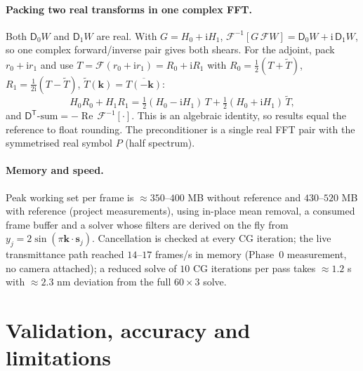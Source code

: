 \documentclass[11pt,a4paper]{article}
\theoremstyle{definition}
\newcommand{\vk}{\bm{k}}
\newcommand{\vs}{\bm{s}}
\newcommand{\ii}{\mathrm{i}}
\newcommand{\FT}{\mathcal{F}}
\newcommand{\IFT}{\mathcal{F}^{-1}}
\newcommand{\Dop}{\mathsf{D}}
\newcommand{\Real}{\operatorname{Re}}
\begin{document}
\paragraph{Packing two real transforms in one complex FFT.}
Both $\Dop_0W$ and $\Dop_1W$ are real. With $G=H_0+\ii H_1$,
$\IFT[G\,\FT W]=\Dop_0W+\ii\,\Dop_1W$, so one complex forward/inverse pair gives both shears. For the adjoint, pack $r_0+\ii r_1$ and use
$T=\FT(r_0+\ii r_1)=R_0+\ii R_1$ with $R_0=\tfrac12(T+\tilde T)$, $R_1=\tfrac1{2\ii}(T-\tilde T)$, $\tilde T(\vk)=\overline{T(-\vk)}$:
\begin{equation}
H_0R_0+H_1R_1=\tfrac12(H_0-\ii H_1)\,T+\tfrac12(H_0+\ii H_1)\,\tilde T,
\end{equation}
and $\Dop^{\mathsf T}\text{-sum}=-\Real\,\IFT[\cdot]$. This is an algebraic identity, so results equal the reference to float rounding. The preconditioner is a single real FFT pair with the symmetrised real symbol $P$ (half spectrum).

\paragraph{Memory and speed.}
Peak working set per frame is $\approx350$--$400$ MB without reference and $430$--$520$ MB with reference (project measurements), using in-place mean removal, a consumed frame buffer and a solver whose filters are derived on the fly from $y_j=2\sin(\pi\vk\cdot\vs_j)$.
Cancellation is checked at every CG iteration; the live transmittance path reached $14$--$17$ frames/s in memory (Phase~0 measurement, no camera attached); a reduced solve of $10$ CG iterations per pass takes $\approx1.2$ s with $\approx2.3$ nm deviation from the full $60\times3$ solve.

\section{Validation, accuracy and limitations}
\label{sec:valid}
\end{document}
